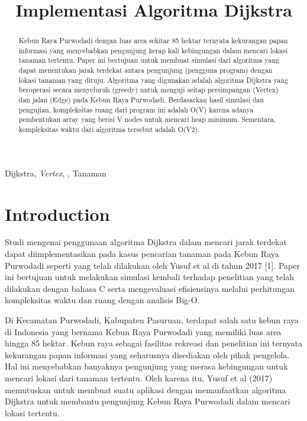 \documentclass[conference]{IEEEtran}
\begin{document}
\title{Implementasi Algoritma Dijkstra}

\author{
}

\graphicspath{{./gambar/}}

\maketitle

\begin{abstract}
    Kebun Raya Purwodadi dengan luas area sekitar 85 hektar ternyata kekurangan papan informasi yang menyebabkan pengunjung kerap kali kebingungan dalam mencari lokasi tanaman tertentu. Paper ini bertujuan untuk membuat simulasi dari algoritma yang dapat menentukan jarak terdekat antara pengunjung (pengguna program) dengan lokasi tanaman yang dituju. Algoritma yang digunakan adalah algoritma Dijkstra yang beroperasi secara menyeluruh (greedy) untuk menguji seitap persimpangan (Vertex) dan jalan (Edge) pada Kebun Raya Purwodadi. Berdasarkan hasil simulasi dan pengujian, kompleksitas ruang dari program ini adalah O(V) karena adanya pembentukan array yang berisi V nodes untuk mencari heap minimum. Sementara, kompleksitas waktu dari algoritma tersebut adalah O(V2).
\end{abstract}

\begin{IEEEkeywords}
    Dijkstra, \textit{Vertex}, , Tanaman
\end{IEEEkeywords}

\section{Introduction}
    Studi mengenai penggunaan algoritma Dijkstra dalam mencari jarak terdekat dapat diimplementasikan pada kasus pencarian tanaman pada Kebun Raya Purwodadi seperti yang telah dilakukan oleh Yusuf et al di tahun 2017 [1]. Paper ini bertujuan untuk melakukan simulasi kembali terhadap penelitian yang telah dilakukan dengan bahasa C serta mengevaluasi efisiensinya melalui perhitungan kompleksitas waktu dan ruang dengan analisis Big-O.

    Di Kecamatan Purwodadi, Kabupaten Pasuruan, terdapat salah satu kebun raya di Indonesia yang bernama Kebun Raya Purwodadi yang memiliki luas area hingga 85 hektar. Kebun raya sebagai fasilitas rekreasi dan penelitian ini ternyata kekurangan papan informasi yang seharusnya disediakan oleh pihak pengelola. Hal ini menyebabkan banyaknya pengunjung yang merasa kebingungan untuk mencari lokasi dari tanaman tertentu. Oleh karena itu, Yusuf et al (2017) memutuskan untuk membuat suatu aplikasi dengan memanfaatkan algoritma Dijkstra untuk membantu pengunjung Kebun Raya Purwodadi dalam mencari lokasi tertentu.
\end{document}
